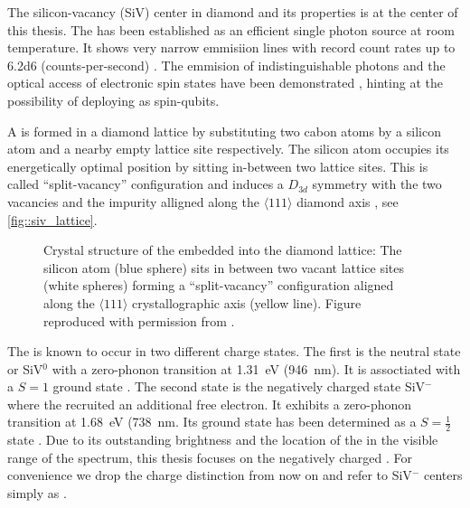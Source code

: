   The silicon-vacancy (SiV) center in diamond and its properties is at the center of this thesis. The \siv has been established as an efficient single photon source at room temperature. It shows very narrow emmisiion lines with record count rates up to \SI{6.2d6}{\cps} (counts-per-second) \cite{janine::55}. The emmision of indistinguishable photons and the optical access of electronic spin states have been demonstrated \cite{janine::27, janine::15, janine::16, janine::17}, hinting at the possibility of deploying \sivs as spin-qubits.

  A \sivc is formed in a diamond lattice by substituting two cabon atoms by a silicon atom and a nearby empty lattice site respectively. The silicon atom occupies its energetically optimal position by sitting in-between two lattice sites. This is called ``split-vacancy'' configuration and induces a $D_{3d}$ symmetry with the two vacancies and the impurity alligned along the $\langle 111 \rangle$ diamond axis \cite{janine:222}, see \autoref{fig::siv_lattice}.

  \begin{figure}[htbp]
		\centering
		\caption[Split-vacancy configuration for \sivs in diamond]{Crystal structure of the \siv embedded into the diamond lattice: The silicon atom (blue sphere) sits in between two vacant lattice sites (white spheres) forming a ``split-vacancy'' configuration aligned along the $\langle 111 \rangle$ crystallographic axis (yellow line). Figure reproduced with permission from \cite{janine::thesis}.}
		\label{fig::siv_lattice}
	\end{figure}


  The \siv is known to occur in two different charge states. The first is the neutral state or SiV$^0$ with a zero-phonon transition at \SI{1.31}{\eV} (\SI{946}{\nm}). It is assoctiated with a $S = 1$ ground state \cite{janine::224}. The second state is the negatively charged state SiV$^{-}$ where the \sivc recruited an additional free electron. It exhibits a zero-phonon transition at \SI{1.68}{\eV} (\SI{738}{\nm}. Its ground state has been determined as a $S = \frac{1}{2}$ state \cite{janine::222, janine::223}. Due to its outstanding brightness and the location of the \zpl in the visible range of the spectrum, this thesis focuses on the negatively charged \siv. For convenience we drop the charge distinction from now on and refer to SiV$^{-}$ centers simply as \sivs.


